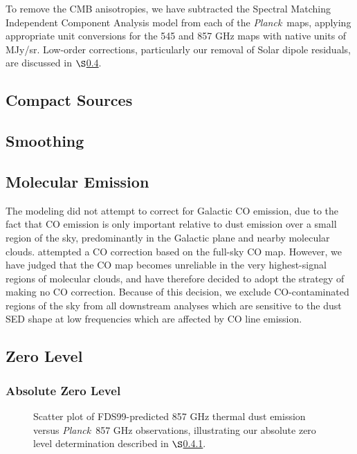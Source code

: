 \documentclass{emulateapj}
\newcommand{\PLANCK}{{\it Planck}}
\begin{document}
To remove the CMB anisotropies, we have subtracted the Spectral Matching 
Independent Component Analysis \citep[SMICA,][]{smica} model from each of the 
\PLANCK~maps, applying appropriate unit conversions for the 545 and 857 GHz 
maps with native units of MJy/sr. Low-order corrections, particularly our 
removal of  Solar dipole residuals, are discussed in $\S$\ref{sec:zp}.

\subsection{Compact Sources}
\label{sec:ptsrc}

\subsection{Smoothing}
\label{sec:smth}

\subsection{Molecular Emission}
\label{sec:mole}

The \cite{planckdust} modeling did not attempt to correct for Galactic CO 
emission, due to the fact that CO emission is only important relative to
dust emission over a small region of the sky, predominantly in the Galactic 
plane and nearby molecular clouds. \cite{meisner15} attempted a CO correction 
based on the \cite{planckco} full-sky CO map. However, we have judged that the 
CO map becomes unreliable in the very highest-signal regions of molecular
clouds, and have therefore decided to adopt the \cite{planckdust} strategy
of making no CO correction. Because of this decision, we exclude 
CO-contaminated regions of the sky from all downstream analyses which are 
sensitive to the dust SED shape at low frequencies which are affected by CO 
line emission.

\subsection{Zero Level}
\label{sec:zp}

\subsubsection{Absolute Zero Level}
\label{sec:zp_abs}

\begin{figure}
\begin{center}
\caption{\label{fig:fdsref} Scatter plot of FDS99-predicted 857 GHz thermal
dust emission versus \PLANCK~857 GHz observations, illustrating our absolute
zero level determination described in $\S$\ref{sec:zp_abs}.}
\end{center}
\end{figure}
\end{document}
